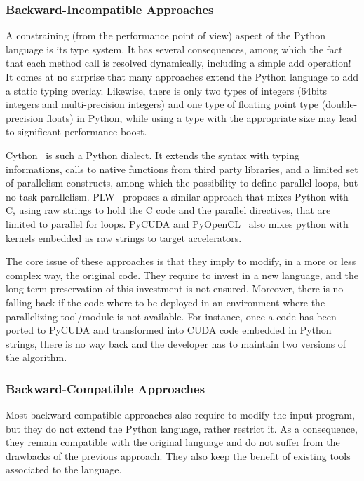 \documentclass{llncs}
\begin{document}
\subsubsection{Backward-Incompatible Approaches}

A constraining (from the performance point of view) aspect of the Python
language is its type system. It has several consequences, among which the fact
that each method call is resolved dynamically, including a simple add
operation! It comes at no surprise that many approaches extend the Python
language to add a static typing overlay. Likewise, there is only two types of
integers (64bits integers and multi-precision integers) and one type of floating
point type (double-precision floats) in Python, while using a type with the
appropriate size may lead to significant performance boost.

Cython~\cite{cython2010} is such a Python dialect. It extends the syntax with
typing informations, calls to native functions from third party libraries, and a
limited set of parallelism constructs, among which the possibility to define
parallel loops, but no task parallelism. PLW~\cite{dongara2007} proposes a
similar approach that mixes Python with C, using raw strings to hold the C code
and the parallel directives, that are limited to parallel for loops.
PyCUDA and PyOpenCL~\cite{klockner2012} also mixes python with kernels embedded
as raw strings to target accelerators.

The core issue of these approaches is that they imply to modify, in a more or
less complex way, the original code. They require to invest in a new language,
and the long-term preservation of this investment is not ensured. Moreover,
there is no falling back if the code where to be deployed in an environment
where the parallelizing tool/module is not available. For instance, once a code
has been ported to PyCUDA and transformed into CUDA code embedded in Python
strings, there is no way back and the developer has to maintain two versions of
the algorithm.

\subsubsection{Backward-Compatible Approaches}

Most backward-compatible approaches also require to modify the input program,
but they do not extend the Python language, rather restrict it. As a
consequence, they remain compatible with the original language and do not suffer
from the drawbacks of the previous approach. They also keep the benefit of
existing tools associated to the language.
\end{document}
